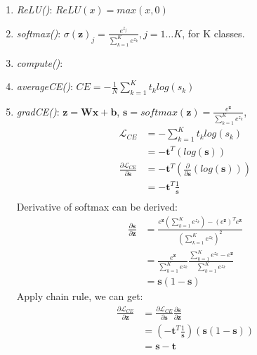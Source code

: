 \documentclass[10pt,letterpaper]{article}
\begin{document}
\begin{enumerate}
  \item \textit{ReLU()}: $ReLU(x) = max(x, 0)$
  
  \item \textit{softmax()}: $\sigma(\textbf{z})_{j} = \frac{e^{z_{j}}}{\sum_{k=1}^{K}e^{z_{k}}}, j = 1\dots K$, for K classes.
  
   \item \textit{compute()}: 
  
   \item \textit{averageCE()}: $CE = -\frac{1}{N}\sum _{k=1}^{K}t_k log(s_k)$
  
   \item \textit{gradCE()}: $ \textbf{z} = \textbf{W}\textbf{x} + \textbf{b}$, $\textbf{s} = softmax(\textbf{z}) = \frac{e^{\textbf{z}}}{\sum_{k=1}^{K}e^{z_{k}}}$, 
   \begin{align*}
        \mathcal{L}_{CE} &= -\sum _{k=1}^{K}t_k log(s_k)\\ &=-\textbf{t}^{T}(log(\textbf{s})) \\
        \frac{\partial \mathcal{L}_{CE}}{\partial  \textbf{s}} &= -\textbf{t}^{T}(\frac{\partial }{\partial  \textbf{s}}(log(\textbf{s})))\\ &= -\textbf{t}^{T}\frac{1}{\textbf{s}}\\
   \end{align*}
   Derivative of softmax can be derived:
   \begin{align*}
       \frac{\partial \textbf{s}}{\partial  \textbf{z}} &= \frac{e^{\textbf{z}}(\sum_{k=1}^{K}e^{z_{k}}) -(e^{\textbf{z}})^{T}e^{\textbf{z}}}{(\sum_{k=1}^{K}e^{z_{k}})^2} \\
       &= \frac{e^{\textbf{z}}}{\sum_{k=1}^{K}e^{z_{k}}}\frac{\sum_{k=1}^{K}e^{z_{k}} - e^{\textbf{z}} }{\sum_{k=1}^{K}e^{z_{k}}} \\
       &= \textbf{s}(1-\textbf{s})
   \end{align*}
   Apply chain rule, we can get: 
   \begin{align*}
              \frac{\partial \mathcal{L}_{CE}}{\partial  \textbf{z}} &=  \frac{\partial \mathcal{L}_{CE}}{\partial  \textbf{s}} \frac{\partial \textbf{s}}{\partial  \textbf{z}}\\ &=(-\textbf{t}^{T}\frac{1}{\textbf{s}})(\textbf{s}(1-\textbf{s}))\\ &= \textbf{s} - \textbf{t}
   \end{align*}
   
  
\end{enumerate}
\end{document}

